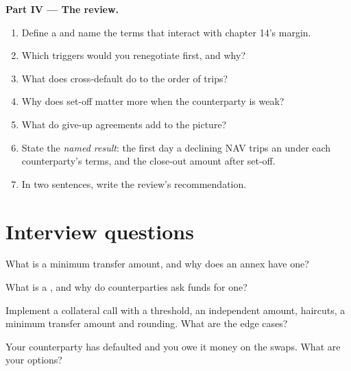 \begin{problem}
\medskip\noindent\textbf{Part IV --- The review.}
\begin{enumerate}[resume]
\item Define a  and name the terms that interact with chapter 14's margin.
\item Which triggers would you renegotiate first, and why?
\item What does cross-default do to the order of trips?
\item Why does set-off matter more when the counterparty is weak?
\item What do give-up agreements add to the picture?
\item State the \emph{named result}: the first day a declining NAV trips an  under each counterparty's terms, and the
close-out amount after set-off.
\item In two sentences, write the review's recommendation.
\end{enumerate}
\end{problem}

\section{Interview questions}

\begin{interviewq}\label{iq:fm:legal-documentation:1}
What is a minimum transfer amount, and why does an annex have one?
\end{interviewq}

\begin{interviewq}\label{iq:fm:legal-documentation:2}
What is a , and why do counterparties ask funds for one?
\end{interviewq}

\begin{interviewq}\label{iq:fm:legal-documentation:3}
Implement a collateral call with a threshold, an independent amount, haircuts, a minimum transfer amount and rounding. What are the edge cases?
\end{interviewq}

\begin{interviewq}\label{iq:fm:legal-documentation:4}
Your counterparty has defaulted and you owe it money on the swaps. What are your options?
\end{interviewq}

